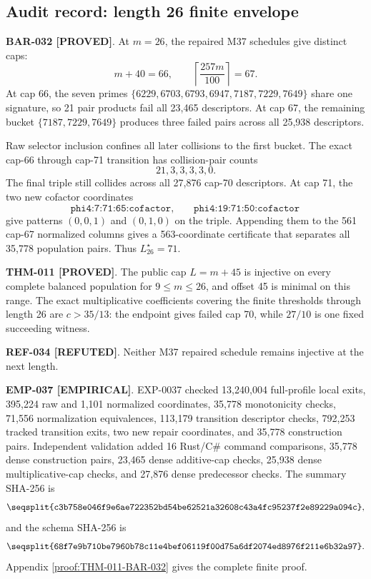 \documentclass[11pt]{article}
\newcommand{\claimstatus}[2]{\textbf{#1 [#2]}}
\begin{document}
\subsection{Audit record: length 26 finite envelope}

\claimstatus{BAR-032}{PROVED}. At \(m=26\), the repaired M37 schedules give
distinct caps:
\[
m+40=66,\qquad
\left\lceil\frac{257m}{100}\right\rceil=67.
\]
At cap 66, the seven primes
\(\{6229,6703,6793,6947,7187,7229,7649\}\) share one signature, so 21
pair products fail all 23,465 descriptors. At cap 67, the remaining bucket
\(\{7187,7229,7649\}\) produces three failed pairs across all 25,938
descriptors.

Raw selector inclusion confines all later collisions to the first bucket.
The exact cap-66 through cap-71 transition has collision-pair counts
\[
21,3,3,3,3,0.
\]
The final triple still collides across all 27,876 cap-70 descriptors. At cap
71, the two new cofactor coordinates
\[
\texttt{phi4:7:71:65:cofactor},\qquad
\texttt{phi4:19:71:50:cofactor}
\]
give patterns \((0,0,1)\) and \((0,1,0)\) on the triple. Appending them to
the 561 cap-67 normalized columns gives a 563-coordinate certificate that
separates all 35,778 population pairs. Thus \(L_{26}^\star=71\).

\claimstatus{THM-011}{PROVED}. The public cap \(L=m+45\) is injective on
every complete balanced population for \(9\le m\le26\), and offset 45 is
minimal on this range. The exact multiplicative coefficients covering the
finite thresholds through length 26 are \(c>35/13\): the endpoint gives
failed cap 70, while \(27/10\) is one fixed succeeding witness.

\claimstatus{REF-034}{REFUTED}. Neither M37 repaired schedule remains
injective at the next length.

\claimstatus{EMP-037}{EMPIRICAL}. EXP-0037 checked 13,240,004 full-profile
local exits, 395,224 raw and 1,101 normalized coordinates, 35,778
monotonicity checks, 71,556 normalization equivalences, 113,179 transition
descriptor checks, 792,253 tracked transition exits, two new repair
coordinates, and 35,778 construction pairs. Independent validation added 16
Rust/C\# command comparisons, 35,778 dense construction pairs, 23,465 dense
additive-cap checks, 25,938 dense multiplicative-cap checks, and 27,876 dense
predecessor checks. The summary SHA-256 is
\[
\texttt{\seqsplit{c3b758e046f9e6ae722352bd54be62521a32608c43a4fc95237f2e89229a094c}},
\]
and the schema SHA-256 is
\[
\texttt{\seqsplit{68f7e9b710be7960b78c11e4bef06119f00d75a6df2074ed8976f211e6b32a97}}.
\]
Appendix \ref{proof:THM-011-BAR-032} gives the complete finite proof.
\end{document}
